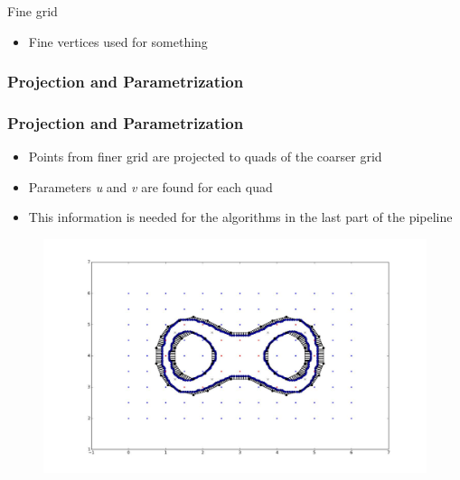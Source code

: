 \begin{frame}
\begin{overlayarea}{\textwidth}{0.9 \textheight}
\begin{minipage}{0.45\textwidth}
\begin{block}{\centering Fine grid}
\begin{figure}
	\end{figure}
	\begin{itemize}
	\item Fine vertices used for something
	\end{itemize}
	\end{block}
	\end{minipage}
	\end{overlayarea}
\end{frame}



\subsubsection{Projection and Parametrization}

\begin{frame}

	\frametitle{Projection and Parametrization}
	
	\begin{itemize}
	\item Points from finer grid are projected to quads of the coarser grid 
	\item Parameters \textit{u} and \textit{v} are found for each quad
	\item This information is needed for the algorithms in the last part of the pipeline
	\end{itemize}
	\begin{figure}
	\includegraphics[scale=0.35]{Pictures/DC/DC_2.pdf}
	\end{figure}
	
\end{frame}





